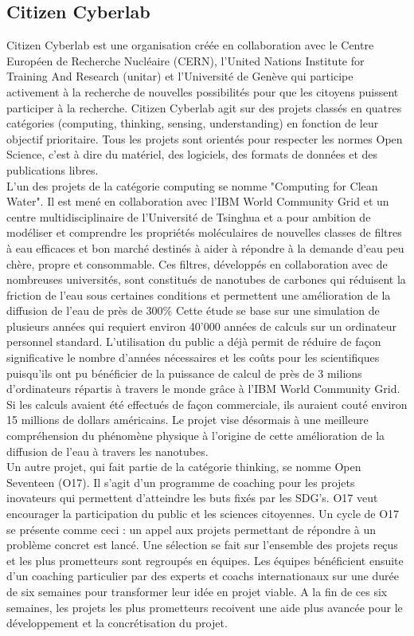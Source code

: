 \documentclass[10pt, article]{llncs}
\begin{document}
	\subsection{Citizen Cyberlab}
		Citizen Cyberlab \cite{noauthor_citizen_nodate} est une organisation créée en collaboration avec le Centre Européen de Recherche Nucléaire (CERN), l'United Nations Institute for Training And Research (unitar) et l'Université de Genève qui participe activement à la recherche de nouvelles possibilités pour que les citoyens puissent participer à la recherche. Citizen Cyberlab agit sur des projets classés en quatres catégories (computing, thinking, sensing, understanding) en fonction de leur objectif prioritaire. Tous les projets sont orientés pour respecter les normes Open Science, c'est à dire du matériel, des logiciels, des formats de données et des publications libres.\\
		L'un des projets de la catégorie computing se nomme "Computing for Clean Water". Il est mené en collaboration avec l'IBM World Community Grid et un centre multidisciplinaire de l'Université de Tsinghua et a pour ambition de modéliser et comprendre les propriétés moléculaires de nouvelles classes de filtres à eau efficaces et bon marché destinés à aider à répondre à la demande d'eau peu chère, propre et consommable. Ces filtres, développés en collaboration avec de nombreuses universités, sont constitués de nanotubes de carbones qui réduisent la friction de l'eau sous certaines conditions et permettent une amélioration de la diffusion de l'eau de près de 300\% Cette étude se base sur une simulation de plusieurs années qui requiert environ 40'000 années de calculs sur un ordinateur personnel standard. L'utilisation du public a déjà permit de réduire de façon significative le nombre d'années nécessaires et les coûts pour les scientifiques puisqu'ils ont pu bénéficier de la puissance de calcul de près de 3 milions d'ordinateurs répartis à travers le monde grâce à l'IBM World Community Grid. Si les calculs avaient été effectués de façon commerciale, ils auraient couté environ 15 millions de dollars américains. Le projet vise désormais à une meilleure compréhension du phénomène physique à l'origine de cette amélioration de la diffusion de l'eau à travers les nanotubes.\\
		Un autre projet, qui fait partie de la catégorie thinking, se nomme Open Seventeen (O17). Il s'agit d'un programme de coaching pour les projets inovateurs qui permettent d'atteindre les buts fixés par les SDG's. O17 veut encourager la participation du public et les sciences citoyennes. Un cycle de O17 se présente comme ceci : un appel aux projets permettant de répondre à un problème concret est lancé. Une sélection se fait sur l'ensemble des projets reçus et les plus prometteurs sont regroupés en équipes. Les équipes bénéficient ensuite d'un coaching particulier par des experts et coachs internationaux sur une durée de six semaines pour transformer leur idée en projet viable. A la fin de ces six semaines, les projets les plus prometteurs recoivent une aide plus avancée pour le développement et la concrétisation du projet.
		
\end{document}
